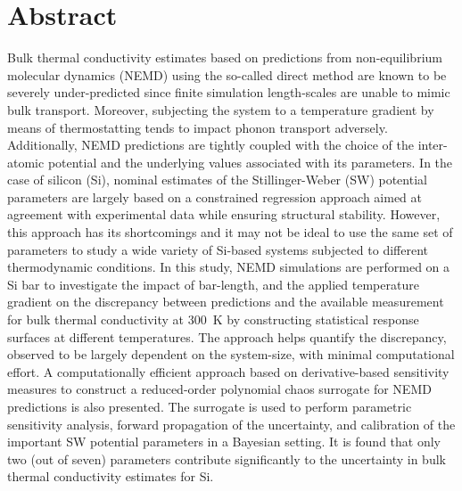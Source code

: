 \section*{Abstract}

Bulk thermal conductivity estimates based on predictions from non-equilibrium molecular dynamics (NEMD)
using the so-called direct method are known to be severely under-predicted since finite simulation
length-scales are unable to mimic bulk transport. Moreover, subjecting the system to a temperature gradient
by means of thermostatting tends to impact phonon transport adversely.  Additionally, NEMD predictions
are tightly coupled with the choice of the inter-atomic potential and the underlying values associated with its
parameters. In the case of silicon (Si), nominal estimates of the Stillinger-Weber (SW) potential parameters are largely based 
on a constrained regression approach aimed at agreement with experimental data while ensuring structural
stability. However, this approach has its shortcomings and it may not be ideal to use the same set of parameters
 to study a wide variety of Si-based
systems subjected to different thermodynamic conditions. 
In this study, NEMD simulations are performed on a Si bar to investigate the impact of bar-length,
and the applied temperature gradient on the discrepancy between predictions and the available measurement 
for bulk thermal conductivity at 300~K by constructing statistical response surfaces at different temperatures. 
The approach helps quantify the discrepancy, observed to be largely dependent on the system-size, with minimal
computational effort. A computationally efficient approach based on derivative-based sensitivity measures to
construct a reduced-order polynomial chaos surrogate for NEMD predictions is also presented. The surrogate
is used to perform parametric sensitivity analysis, forward propagation of the uncertainty, and calibration of the important SW potential parameters in a 
Bayesian setting. It is found that only two (out of seven) parameters contribute significantly to the uncertainty
in bulk thermal conductivity estimates for Si. 
